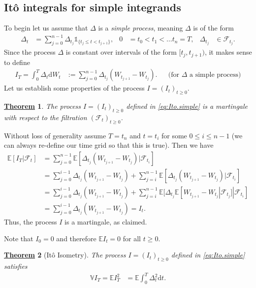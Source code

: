 \documentclass[12pt]{book}
\numberwithin{equation}{chapter}
\theoremstyle{plain}
\newtheorem{theorem}{\underline{Theorem}}
\numberwithin{theorem}{section}
\theoremstyle{definition}
\numberwithin{exercise}{chapter}
\let\oldendproof\endproof
\renewenvironment{proof}[1][\proofname]{%
  \oldproof[\scshape\underline{#1}]%
}{\oldendproof}
\newcommand{\<}{\langle}
\renewcommand{\>}{\rangle}
\renewcommand{\(}{\left(}
\renewcommand{\)}{\right)}
\renewcommand{\[}{\left[}
\renewcommand{\]}{\right]}
\newcommand\Eb{\mathds{E}}
\newcommand\Ib{\mathds{1}} 	%
\newcommand\Vb{\mathds{V}}
\newcommand\Fc{\mathscr{F}}
\newcommand\Del{\Delta}
\newcommand\dd{\mathrm{d}}
\begin{document}
\subsection*{It\^o integrals for simple integrands}
To begin let us assume that $\Del$ is a \emph{simple process}, meaning $\Del$ is of the form
\begin{align}
\Del_t
	&=	\sum_{j=0}^{n-1} \Del_{t_j} \Ib_{\{t_j \leq t < t_{j+1}\}} , &
0
	&=	t_0 < t_1 < \ldots t_n = T , &
\Del_{t_j}
	&\in \Fc_{t_j} . \label{eq:Delta.simple}
\end{align}
Since the process $\Del$ is constant over intervals of the form $[t_j,t_{j+1})$, it makes sense to define
\begin{align}
I_T = \int_0^T \Del_t \dd W_t
	&:=	\sum_{j=0}^{n-1} \Del_{t_j} ( W_{t_{j+1}} - W_{t_j} ) . &
	&		\text{(for $\Del$ a simple process)} \label{eq:Ito.simple}
\end{align}
Let us establish some properties of the process $I = (I_t)_{t \geq 0}$.

\begin{theorem}
The process $I = (I_t)_{t \geq 0}$ defined in \eqref{eq:Ito.simple} is a martingale with respect to the filtration $(\Fc_t)_{t \geq 0}$.
\end{theorem}

\begin{proof}
Without loss of generality assume $T = t_{n}$ and $t = t_i$ for some $0 \leq i \leq n-1$ (we can always re-define our time grid so that this is true).  Then we have
\begin{align}
\Eb[ I_T | \Fc_t ]
	&=	\sum_{j=0}^{n-1} \Eb[ \Del_{t_j} ( W_{t_{j+1}} - W_{t_j} ) | \Fc_{t_i} ] \\
	&=	\sum_{j=0}^{i-1} \Del_{t_j} ( W_{t_{j+1}} - W_{t_j} ) + \sum_{j=i}^{n-1} \Eb[ \Del_{t_j} ( W_{t_{j+1}} - W_{t_j} ) | \Fc_{t_i} ] \\
	&=	\sum_{j=0}^{i-1} \Del_{t_j} ( W_{t_{j+1}} - W_{t_j} ) + \sum_{j=i}^{n-1} \Eb[ \Del_{t_j} \Eb[ W_{t_{j+1}} - W_{t_j} | \Fc_{t_j}] | \Fc_{t_i} ] \\
	&=	\sum_{j=0}^{i-1} \Del_{t_j} ( W_{t_{j+1}} - W_{t_j} ) = I_t .
\end{align}
Thus, the process $I$ is a martingale, as claimed.
\end{proof}

\noindent
Note that $I_0 = 0$ and therefore $\Eb I_t = 0$ for all $t \geq 0$.

\begin{theorem}[It\^o Isometry]
The process $I = (I_t)_{t \geq 0}$ defined in \eqref{eq:Ito.simple} satisfies
\begin{align}
\Vb I_T = \Eb I_T^2 
	&= \Eb \int_0^T \Del_t^2 \dd t. \label{eq:Ito.var}
\end{align}
\end{theorem}
\end{document}
